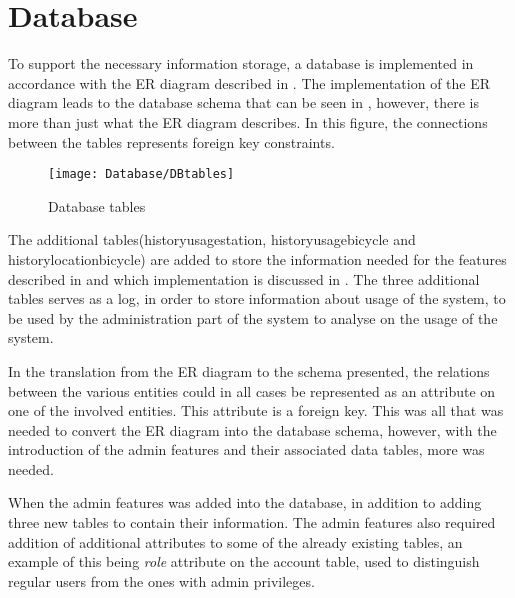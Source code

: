 \section{Database}
To support the necessary information storage, a database is implemented in accordance with the ER diagram described in .
The implementation of the ER diagram leads to the database schema that can be seen in , however, there is more than just what the ER diagram describes.
In this figure, the connections between the tables represents foreign key constraints.

\begin{figure}[h]
	\centering
	\texttt{[image: Database/DBtables]}
	\caption{Database tables}\label{fig:Database-tables}
\end{figure}

The additional tables(historyusagestation, historyusagebicycle and historylocationbicycle) are added to store the information needed for the features described in  and which implementation is discussed in .
The three additional tables serves as a log, in order to store information about usage of the system, to be used by the administration part of the system to analyse on the usage of the system.

In the translation from the ER diagram to the schema presented, the relations between the various entities could in all cases be represented as an attribute on one of the involved entities.
This attribute is a foreign key.
This was all that was needed to convert the ER diagram into the database schema, however, with the introduction of the admin features and their associated data tables, more was needed.

When the admin features was added into the database, in addition to adding three new tables to contain their information.
The admin features also required addition of additional attributes to some of the already existing tables, an example of this being \textit{role} attribute on the account table, used to distinguish regular users from the ones with admin privileges.

